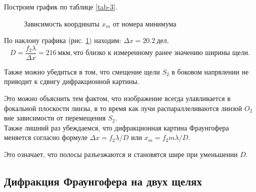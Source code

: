\documentclass{lab}
\begin{document}
Построим график по таблице \ref{tab-3}.
\begin{figure}[H]
	\centering
	\caption{Зависимость координаты $ x_m $ от номера минимума}
	\label{g_2}
\end{figure}

По наклону графика (рис. \ref{g_2}) находим: $ \Delta x = 20.2~дел $.
\begin{equation}
D = \dfrac{f_2 \lambda}{\Delta x} = 216~мкм, \text{что близко к измеренному ранее значению ширины щели.}
\end{equation}

Также можно убедиться в том, что смещение щели $ S_2 $ в боковом напрвлении не приводит к сдвигу дифракционной картины.

Это можно объяснить тем фактом, что изображение всегда улавливается в фокальной плоскости линзы, в то время как лучи распараллеливаются линзой $ O_2 $ вне зависимости от перемещения $ S_2 $.\\

Также лишний раз убеждаемся, что дифракционная картина Фраунгофера меняется согласно формуле $ \Delta x = f_2 \lambda / D $ или $ x_m = f_2 m \lambda / D $.

Это означает, что полосы разъезжаются и становятся шире при уменьшении $ D $.

\subsection*{Дифракция Фраунгофера на двух щелях}
\end{document}
